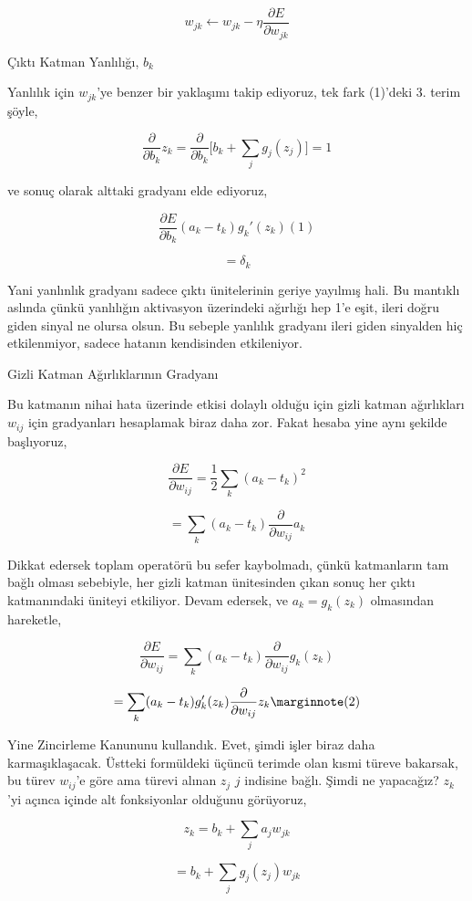 \documentclass[12pt,fleqn]{article}\usepackage{../../common}
\begin{document}
$$ w_{jk} \leftarrow w_{jk} - \eta  \frac{\partial E}{\partial w_{jk}} $$

Çıktı Katman Yanlılığı, $b_k$

Yanlılık için $w_{jk}$'ye benzer bir yaklaşımı takip ediyoruz, tek fark
(1)'deki 3. terim şöyle, 

$$ 
\frac{\partial }{\partial b_k} z_k = 
\frac{\partial }{\partial b_k} \big[ b_k + \sum_j g_j(z_j) \big] = 1 
$$

ve sonuç olarak alttaki gradyanı elde ediyoruz, 

$$  \frac{\partial E}{\partial b_k} (a_k-t_k) g_k'(z_k)(1)$$

$$ = \delta_k$$

Yani yanlınlık gradyanı sadece çıktı ünitelerinin geriye yayılmış hali. Bu
mantıklı aslında çünkü yanlılığın aktivasyon üzerindeki ağırlığı hep 1'e
eşit, ileri doğru giden sinyal ne olursa olsun. Bu sebeple yanlılık
gradyanı ileri giden sinyalden hiç etkilenmiyor, sadece hatanın kendisinden
etkileniyor. 

Gizli Katman Ağırlıklarının Gradyanı

Bu katmanın nihai hata üzerinde etkisi dolaylı olduğu için gizli katman
ağırlıkları $w_{ij}$ için gradyanları hesaplamak biraz daha zor. Fakat
hesaba yine aynı şekilde başlıyoruz, 

$$ \frac{\partial E}{\partial w_{ij}} = 
\frac{1}{2} \sum_k (a_k-t_k)^2
$$

$$ = \sum_k (a_k-t_k) \frac{\partial }{\partial w_{ij}} a_k$$

Dikkat edersek toplam operatörü bu sefer kaybolmadı, çünkü katmanların tam
bağlı olması sebebiyle, her gizli katman ünitesinden çıkan sonuç her çıktı
katmanındaki üniteyi etkiliyor. Devam edersek, ve $a_k = g_k(z_k)$
olmasından hareketle,

$$ 
\frac{\partial E}{\partial w_{ij}} = 
\sum_k (a_k-t_k) \frac{\partial }{\partial w_{ij}} g_k(z_k)
$$

$$ 
= \sum_k (a_k-t_k) g_k'(z_k)
\frac{ \partial }{ \partial w_{ij} } z_k
\mlabel{2}
$$

Yine Zincirleme Kanununu kullandık. Evet, şimdi işler biraz daha
karmaşıklaşacak. Üstteki formüldeki üçüncü terimde olan kısmi türeve
bakarsak, bu türev $w_{ij}$'e göre ama türevi alınan $z_j$ $j$ indisine
bağlı. Şimdi ne yapacağız? $z_k$'yi açınca içinde alt fonksiyonlar olduğunu
görüyoruz, 

$$ z_k = b_k + \sum_j a_j w_{jk}$$

$$ = b_k + \sum_j g_j(z_j) w_{jk}$$
\end{document}
